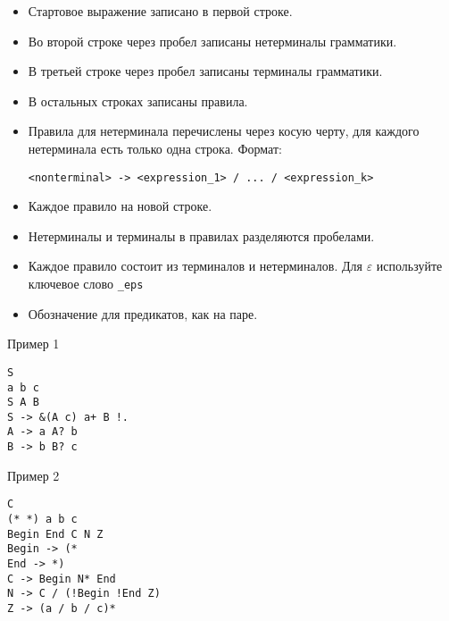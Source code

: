 \documentclass[12pt]{article}
\begin{document}
\begin{itemize}
    \item Стартовое выражение записано в первой строке.
    \item Во второй строке через пробел записаны нетерминалы грамматики.
    \item В третьей строке через пробел записаны терминалы грамматики.
    \item В остальных строках записаны правила.
    \item { Правила для нетерминала перечислены через косую черту, для каждого нетерминала есть только одна строка. Формат:

 \verb!<nonterminal> -> <expression_1> / ... / <expression_k>! }
    \item Каждое правило на новой строке.
    \item Нетерминалы и терминалы в правилах разделяются пробелами.
    \item Каждое правило состоит из терминалов и нетерминалов. Для $\varepsilon$ используйте ключевое слово \verb!_eps!
    \item Обозначение для предикатов, как на паре.
\end{itemize}

\newpage

\begin{center} Пример 1 \end{center}

\begin{verbatim}
S
a b c
S A B
S -> &(A c) a+ B !.
A -> a A? b
B -> b B? c
\end{verbatim}

\begin{center} Пример 2 \end{center}

\begin{verbatim}
C
(* *) a b c 
Begin End C N Z
Begin -> (* 
End -> *)
C -> Begin N* End
N -> C / (!Begin !End Z)
Z -> (a / b / c)* 
\end{verbatim}
\end{document}
